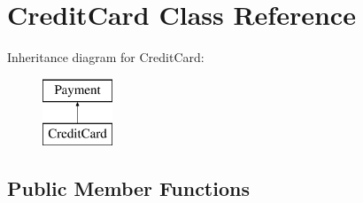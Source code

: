 \hypertarget{classCreditCard}{}\section{Credit\+Card Class Reference}
\label{classCreditCard}
Inheritance diagram for Credit\+Card\+:\begin{figure}[H]
\begin{center}
\leavevmode
\includegraphics[height=2.000000cm]{classCreditCard}
\end{center}
\end{figure}
\subsection*{Public Member Functions}
